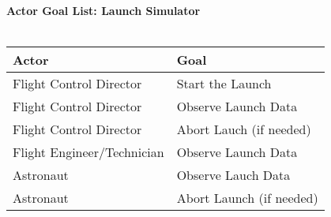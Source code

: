 \documentclass[letterpaper]{article}
\begin{document}
\noindent
\textbf{Actor Goal List: Launch Simulator}\\\\
\vspace{4ex}
\begin{tabular}{|p{5cm}|p{5cm}|}\hline
\textbf{Actor} & \textbf{Goal}\\\hline
Flight Control Director & Start the Launch\\\hline
Flight Control Director & Observe Launch Data\\\hline
Flight Control Director & Abort Lauch (if needed)\\\hline
Flight Engineer/Technician & Observe Launch Data\\\hline
Astronaut & Observe Lauch Data\\\hline
Astronaut & Abort Launch (if needed)\\\hline
\end{tabular}
\end{document}
